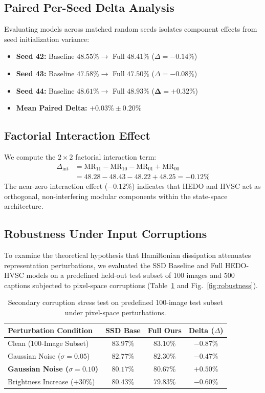 \documentclass[11pt,journal,onecolumn,draftcls]{IEEEtran}
\begin{document}
\subsection{Paired Per-Seed Delta Analysis}
Evaluating models across matched random seeds isolates component effects from seed initialization variance:
\begin{itemize}
    \item \textbf{Seed 42:} Baseline $48.55\% \rightarrow$ Full $48.41\%$ ($\Delta = -0.14\%$)
    \item \textbf{Seed 43:} Baseline $47.58\% \rightarrow$ Full $47.50\%$ ($\Delta = -0.08\%$)
    \item \textbf{Seed 44:} Baseline $48.61\% \rightarrow$ Full $48.93\%$ ($\mathbf{\Delta = +0.32\%}$)
    \item \textbf{Mean Paired Delta:} $\mathbf{+0.03\% \pm 0.20\%}$
\end{itemize}

\subsection{Factorial Interaction Effect}
We compute the $2 \times 2$ factorial interaction term:
\begin{align}
\Delta_{\text{int}} &= \text{MR}_{11} - \text{MR}_{10} - \text{MR}_{01} + \text{MR}_{00} \nonumber \\
&= 48.28 - 48.43 - 48.22 + 48.25 = -0.12\%
\end{align}
The near-zero interaction effect ($-0.12\%$) indicates that HEDO and HVSC act as orthogonal, non-interfering modular components within the state-space architecture.

\subsection{Robustness Under Input Corruptions}
To examine the theoretical hypothesis that Hamiltonian dissipation attenuates representation perturbations, we evaluated the SSD Baseline and Full HEDO-HVSC models on a predefined held-out test subset of 100 images and 500 captions subjected to pixel-space corruptions (Table~\ref{tab:robustness} and Fig.~\ref{fig:robustness}).

\begin{table}[h]
\centering
\caption{Secondary corruption stress test on predefined 100-image test subset under pixel-space perturbations.}
\label{tab:robustness}
\begin{tabular}{lccc}
\toprule
\textbf{Perturbation Condition} & \textbf{SSD Base} & \textbf{Full Ours} & \textbf{Delta ($\Delta$)} \\
\midrule
Clean (100-Image Subset) & $83.97\%$ & $83.10\%$ & $-0.87\%$ \\
Gaussian Noise ($\sigma=0.05$) & $82.77\%$ & $82.30\%$ & $-0.47\%$ \\
\textbf{Gaussian Noise ($\sigma=0.10$)} & $80.17\%$ & $\mathbf{80.67\%}$ & $\mathbf{+0.50\%}$ \\
Brightness Increase ($+30\%$) & $80.43\%$ & $79.83\%$ & $-0.60\%$ \\
\bottomrule
\end{tabular}
\end{table}
\end{document}
